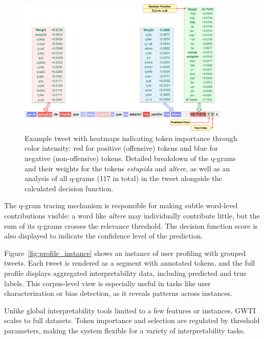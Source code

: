 \documentclass[runningheads,10pt]{llncs}
\begin{document}
\begin{figure}[h]
  \centering
  \includegraphics[width=0.9\textwidth]{tweet_sample_77.drawio.png}
  \caption{Example tweet with heatmaps indicating token importance through color intensity: red for positive (offensive) tokens and blue for negative (non-offensive) tokens. Detailed breakdown of the q-grams and their weights for the tokens \textit{estupida} and \textit{altere}, as well as an analysis of all q-grams (117 in total) in the tweet alongside the calculated decision function.}
  \label{fig:tweet_instance}
\end{figure}

The q-gram tracing mechanism is responsible for making subtle word-level contributions visible: a word like \textit{altere} may individually contribute little, but the sum of its q-grams crosses the relevance threshold. The decision function score is also displayed to indicate the confidence level of the prediction.

Figure~\ref{fig:profile_instance} shows an instance of user profiling with grouped tweets. Each tweet is rendered as a segment with annotated tokens, and the full profile displays aggregated interpretability data, including predicted and true labels. This corpus-level view is especially useful in tasks like user characterization or bias detection, as it reveals patterns across instances.

Unlike global interpretability tools limited to a few features or instances, \ac{GWTI} scales to full datasets. Token importance and selection are regulated by threshold parameters, making the system flexible for a variety of interpretability tasks.
\end{document}
